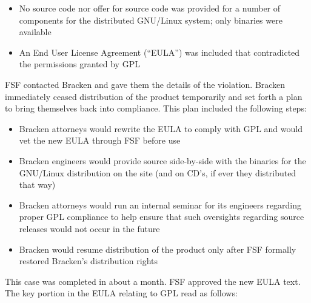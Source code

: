 {\begin{itemize}

\item No source code nor offer for source code was provided for a number
  of components for the distributed GNU/Linux system; only binaries were
  available

\item An End User License Agreement (``EULA'') was included that
  contradicted the permissions granted by GPL\@

\end{itemize}

FSF contacted Bracken and gave them the details of the violation. Bracken
immediately ceased distribution of the product temporarily and set forth
a plan to bring themselves back into compliance. This plan included the
following steps:

\begin{itemize}

\item Bracken attorneys would rewrite the EULA to comply with GPL and
  would vet the new EULA through FSF before use

\item Bracken engineers would provide source side-by-side with the
  binaries for the GNU/Linux distribution on the site (and on CD's, if
  ever they distributed that way)

\item Bracken attorneys would run an internal seminar for its engineers
  regarding proper GPL compliance to help ensure that such oversights
  regarding source releases would not occur in the future

\item Bracken would resume distribution of the product only after FSF
  formally restored Bracken's distribution rights
\end{itemize}

This case was completed in about a month. FSF approved the new EULA
text. The key portion in the EULA relating to GPL read as follows:

}
